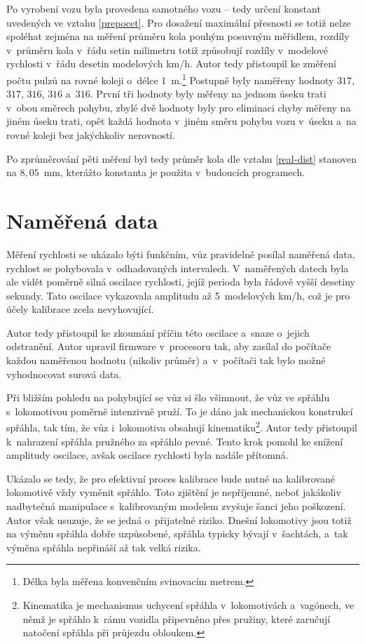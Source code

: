 Po vyrobení vozu byla provedena  samotného vozu -- tedy určení
konstant uvedených ve vztahu \ref{prepocet}. Pro dosažení maximální přesnosti
se totiž nelze spoléhat zejména na měření průměru kola pouhým posuvným
měřidlem, rozdíly v~průměru kola v~řádu setin milimetru totiž způsobují rozdíly
v~modelové rychlosti v~řádu desetin modelových km/h. Autor tedy přistoupil ke
změření počtu pulzů na rovné koleji o~délce 1~m.\footnote{Délka byla měřena
konvenčním svinovacím metrem.} Postupně byly naměřeny hodnoty $317$, $317$,
$316$, $316$ a~$316$. První tři hodnoty byly měřeny na jednom úseku trati
v~obou směrech pohybu, zbylé dvě hodnoty byly pro eliminaci chyby měřeny na
jiném úseku trati, opět každá hodnota v~jiném směru pohybu vozu v~úseku a~na
rovné koleji bez jakýchkoliv nerovností.

Po zprůměrování pěti měření byl tedy průměr kola dle vztahu \ref{real-dist}
stanoven na $8,05$~mm, kterážto konstanta je použita v~budoucích programech.

\section{Naměřená data}
\label{sec:wsm-data}

Měření rychlosti se ukázalo býti funkčním, vůz pravidelně posílal naměřená
data, rychlost se pohybovala v~odhadovaných intervalech. V~naměřených datech
byla ale vidět poměrně silná oscilace rychlosti, jejíž perioda byla řádově
vyšší desetiny sekundy. Tato oscilace vykazovala amplitudu až
5~modelových km/h, což je pro účely kalibrace zcela nevyhovující.

Autor tedy přistoupil ke zkoumání příčin této oscilace a~snaze o~jejich
odstranění. Autor upravil firmware v~procesoru tak, aby zasílal do počítače
každou naměřenou hodnotu (nikoliv průměr) a~v~počítači tak bylo možné
vyhodnocovat surová data.

Při bližším pohledu na pohybující se vůz si šlo všimnout, že vůz ve spřáhlu
s~lokomotivou poměrně intenzivně pruží. To je dáno jak mechanickou konstrukcí
spřáhla, tak tím, že vůz i~lokomotiva obsahují kinematiku\footnote{Kinematika
je mechanismus uchycení spřáhla v~lokomotivách a~vagónech, ve němž je spřáhlo
k~rámu vozidla připevněno přes pružiny, které zaručují natočení spřáhla při
průjezdu obloukem.}.
Autor tedy přistoupil k~nahrazení spřáhla pružného za spřáhlo pevné. Tento krok
pomohl ke snížení amplitudy oscilace, avšak oscilace rychlosti byla nadále
přítomná.

Ukázalo se tedy, že pro efektivní proces kalibrace bude nutné na kalibrované
lokomotivě vždy vyměnit spřáhlo. Toto zjištění je nepříjemné, neboť
jakákoliv nadbytečná manipulace s~kalibrovaným modelem zvyšuje šanci jeho
poškození. Autor však usuzuje, že se jedná o~přijatelné riziko. Dnešní
lokomotivy jsou totiž na výměnu spřáhla dobře uzpůsobené, spřáhla typicky
bývají v~šachtách, a~tak výměna spřáhla nepřináší až tak velká rizika.

